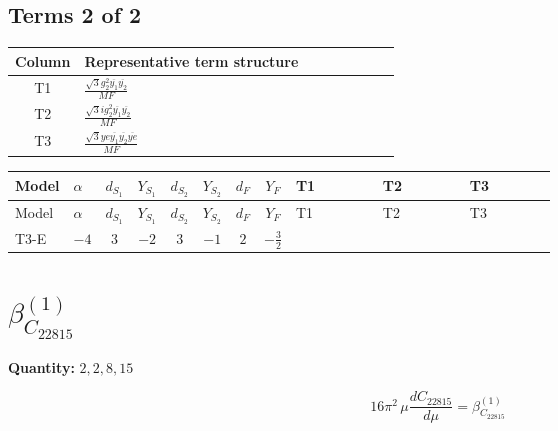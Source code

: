 \documentclass[8pt]{article}
\begin{document}
\begin{landscape}
\subsection*{Terms 2 of 2}
\begin{center}
\begin{tabular}{@{}c >{\raggedright\arraybackslash}p{0.82\linewidth}@{}}
\toprule
Column & Representative term structure \\
\midrule
T1 & \(\displaystyle \frac{\sqrt{3} g_{2}^{2} \overline{y_{1}} \overline{y_{2}}}{MF}\) \\
\midrule
T2 & \(\displaystyle \frac{\sqrt{3} i g_{2}^{2} \overline{y_{1}} \overline{y_{2}}}{MF}\) \\
\midrule
T3 & \(\displaystyle \frac{\sqrt{3} ye \overline{y_{1}} \overline{y_{2}} \overline{ye}}{MF}\) \\
\midrule
\bottomrule
\end{tabular}
\end{center}
\smallskip
\tiny
\begin{longtable}{@{}llcccccc >{\raggedright\arraybackslash}p{0.21\linewidth} >{\raggedright\arraybackslash}p{0.21\linewidth} >{\raggedright\arraybackslash}p{0.21\linewidth}@{}}
\toprule
Model & $\alpha$ & $d_{S_1}$ & $Y_{S_1}$ & $d_{S_2}$ & $Y_{S_2}$ & $d_F$ & $Y_F$ & T1 & T2 & T3 \\
\midrule
\endfirsthead
\toprule
Model & $\alpha$ & $d_{S_1}$ & $Y_{S_1}$ & $d_{S_2}$ & $Y_{S_2}$ & $d_F$ & $Y_F$ & T1 & T2 & T3 \\
\midrule
\endhead
T3-E & $-4$ & $3$ & $-2$ & $3$ & $-1$ & $2$ & $-\frac{3}{2}$ & \scriptsize\adjustbox{max width=\linewidth}{$\begin{gathered} \frac{11 \sqrt{3} g_{2}^{2} \overline{y_{1}} \overline{y_{2}}}{8 MF}\end{gathered}$} & \scriptsize\adjustbox{max width=\linewidth}{$\begin{gathered} - \frac{\sqrt{3} i g_{2}^{2} \overline{y_{1}} \overline{y_{2}}}{6 MF}\end{gathered}$} & \scriptsize\adjustbox{max width=\linewidth}{$\begin{gathered} - \frac{\sqrt{3} ye \overline{y_{1}} \overline{y_{2}} \overline{ye}}{12 MF}\end{gathered}$} \\
\midrule
\bottomrule
\end{longtable}
\clearpage
\section*{$\beta_{C_{22815}}^{(1)}$}
\noindent\textbf{Quantity: }$\mathrm{2,2,8,15}$\par\smallskip
\[16\pi^2\,\mu\frac{d C_{22815}}{d\mu}=\beta_{C_{22815}}^{(1)}\]

\end{landscape}
\end{document}
